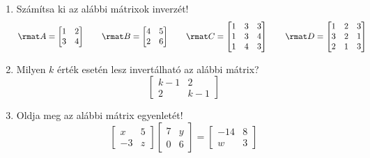 \documentclass[a4paper, 12pt]{scrartcl}
\begin{document}
\begin{enumerate}
  \item Számítsa ki az alábbi mátrixok inverzét!
        $$
          \rmat A =
          \begin{bmatrix}
            1 & 2 \\
            3 & 4
          \end{bmatrix}
          \qquad
          \rmat B =
          \begin{bmatrix}
            4 & 5 \\
            2 & 6
          \end{bmatrix}
          \qquad
          \rmat C =
          \begin{bmatrix}
            1 & 3 & 3 \\
            1 & 3 & 4 \\
            1 & 4 & 3
          \end{bmatrix}
          \qquad
          \rmat D =
          \begin{bmatrix}
            1 & 2 & 3 \\
            3 & 2 & 1 \\
            2 & 1 & 3
          \end{bmatrix}
        $$

  \item Milyen $k$ érték esetén lesz invertálható az alábbi mátrix?
        $$
          \begin{bmatrix}
            k-1 & 2   \\
            2   & k-1
          \end{bmatrix}
        $$

  \item Oldja meg az alábbi mátrix egyenletét!
        $$
          \begin{bmatrix}
            x  & 5 \\
            -3 & z
          \end{bmatrix}
          \begin{bmatrix}
            7 & y \\
            0 & 6
          \end{bmatrix}
          =
          \begin{bmatrix}
            -14 & 8 \\
            w   & 3
          \end{bmatrix}
        $$


\end{enumerate}
\end{document}
